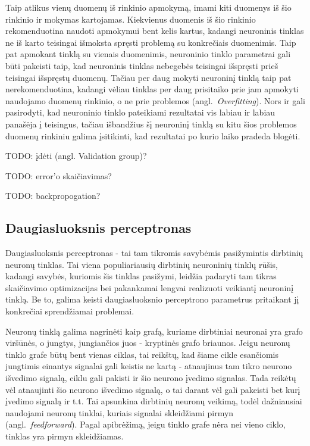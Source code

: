 \documentclass{VUMIFPSbakalaurinis}
\newcommand{\TODO}[1]{
\colorbox{todo-background-color}{TODO: #1}
}
\begin{document}
Taip atlikus vienų duomenų iš rinkinio apmokymą, imami kiti duomenys iš šio rinkinio ir mokymas kartojamas.
Kiekvienus duomenis iš šio rinkinio rekomenduotina naudoti apmokymui bent kelis kartus, kadangi neuroninis tinklas ne iš karto teisingai išmoksta spręsti problemą su konkrečiais duomenimis.
Taip pat apmokant tinklą su vienais duomenimis, neuroninio tinklo parametrai gali būti pakeisti taip, kad neuroninis tinklas nebegebės teisingai išspręsti prieš teisingai išspręstų duomenų.
Tačiau per daug mokyti neuroninį tinklą taip pat nerekomenduotina, kadangi vėliau tinklas per daug prisitaiko prie jam apmokyti naudojamo duomenų rinkinio, o ne prie problemos (angl.~\textit{Overfitting}).
Nors ir gali pasirodyti, kad neuroninio tinklo pateikiami rezultatai vis labiau ir labiau panašėja į teisingus, tačiau išbandžius šį neuroninį tinklą su kitu šios problemos duomenų rinkiniu galima įsitikinti, kad rezultatai po kurio laiko pradeda blogėti.
\TODO{įdėti (angl. Validation group)?}

\TODO{error'o skaičiavimas?}

\TODO{backpropogation?}

\subsection{Daugiasluoksnis perceptronas}

Daugiasluoksnis perceptronas - tai tam tikromis savybėmis pasižymintis dirbtinių neuronų tinklas.
Tai viena populiariausių dirbtinių neuroninių tinklų rūšis, kadangi savybės, kuriomis šis tinklas pasižymi, leidžia padaryti tam tikras skaičiavimo optimizacijas bei pakankamai lengvai realizuoti veikiantį neuroninį tinklą.
Be to, galima keisti daugiasluoksnio perceptrono parametrus pritaikant jį konkrečiai sprendžiamai problemai.

Neuronų tinklą galima nagrinėti kaip grafą, kuriame dirbtiniai neuronai yra grafo viršūnės, o jungtys, jungiančios juos - kryptinės grafo briaunos.
Jeigu neuronų tinklo grafe būtų bent vienas ciklas, tai reikštų, kad šiame cikle esančiomis jungtimis einantys signalai gali keistis ne kartą - atnaujinus tam tikro neurono išvedimo signalą, ciklu gali pakisti ir šio neurono įvedimo signalas.
Tada reikėtų vėl atnaujinti šio neurono išvedimo signalą, o tai darant vėl gali pakeisti bet kurį įvedimo signalą ir t.t.
Tai apsunkina dirbtinių neuronų veikimą, todėl dažniausiai naudojami neuronų tinklai, kuriais signalai skleidžiami pirmyn (angl.~\textit{feedforward}).
Pagal apibrėžimą, jeigu tinklo grafe nėra nei vieno ciklo, tinklas yra pirmyn skleidžiamas.
\end{document}
